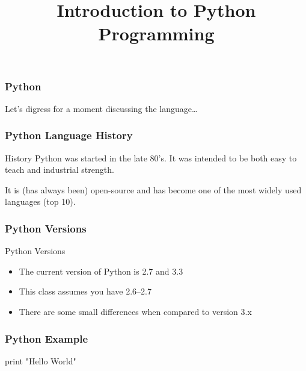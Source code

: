 
\title{Introduction to Python Programming}


\frame{\maketitle}


\begin{frame}[fragile]
\frametitle{Python}

Let's digress for a moment discussing the language\ldots
\end{frame}


\begin{frame}[fragile]
\frametitle{Python Language History}

\begin{block}{History}
Python was started in the late 80's. It was intended to be both \alert{easy to teach} and \alert{industrial strength}.

It is (has always been) open-source and has become one of the most widely used languages (top 10).
\end{block}
\end{frame}

\begin{frame}
\frametitle{Python Versions}

\begin{block}{Python Versions}
\begin{itemize}
\item The current version of Python is \alert{2.7} and \alert{3.3}
\item This class assumes you have 2.6--2.7
\item There are some small differences when compared to version 3.x
\end{itemize}
\end{block}

\end{frame}

\begin{frame}[fragile]
\frametitle{Python Example}

\begin{python}
print "Hello World"
\end{python}
\end{frame}



